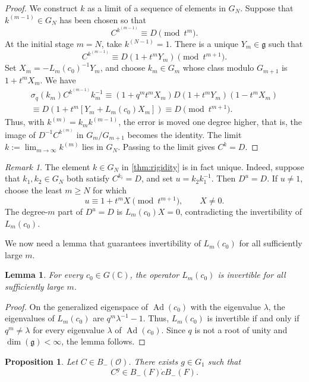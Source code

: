 \documentclass[11pt]{amsart}
\numberwithin{equation}{section}
\newtheorem{proposition}[proposition]{Proposition}
\newtheorem{lemma}[lemma]{Lemma}
\theoremstyle{definition}
\theoremstyle{remark}
\newtheorem{remark}[remark]{Remark}
\begin{document}
\begin{proof}
We construct $k$ as a limit of a sequence of elements in $G_N$. Suppose that $k^{(m-1)}\in G_N$ has been
chosen so that
\[
  C^{k^{(m-1)}}\equiv D\pmod{t^m}.
\]
At the initial stage $m=N$, take $k^{(N-1)}=1$.  There is a unique
$Y_m\in\mathfrak{g}$ such that
\[
  C^{k^{(m-1)}}\equiv D(1+t^mY_m)\pmod{t^{m+1}}.
\]
Set $X_m=-L_m(c_0)^{-1}Y_m$, and choose $k_m\in G_m$ whose class modulo $G_{m+1}$ is $1+t^mX_m$. We have
\begin{align}
  \sigma_q(k_m)C^{k^{(m-1)}}k_m^{-1}
  \equiv \left(1+q^mt^mX_m\right)D\left(1+t^mY_m\right)\left(1-t^mX_m\right)\\
  \equiv D\left(1+t^m[Y_m+L_m(c_0)X_m]\right)
  \equiv D\pmod{t^{m+1}}.
\end{align}
Thus, with $k^{(m)}=k_mk^{(m-1)}$, the error is moved one degree higher, that is, the image of $D^{-1}C^{k^{(m)}}$ in $G_m/G_{m+1}$ becomes the identity.
The limit $k:=\lim_{m\to\infty}k^{(m)}$ lies in $G_N$. Passing to the limit gives $C^k=D$.
\end{proof}
\begin{remark}
The element $k\in G_N$ in \cref{thm:rigidity} is in fact unique. Indeed, suppose that $k_1,k_2\in G_N$ both satisfy $C^{k_i}=D$, and set
$u=k_2k_1^{-1}$.  Then $D^u=D$.  If $u\neq1$, choose the least $m\geq N$
for which
\[
  u\equiv1+t^mX\pmod{t^{m+1}},\qquad X\neq0.
\]
The degree-$m$ part of $D^u=D$ is $L_m(c_0)X=0$, contradicting the
invertibility of $L_m(c_0)$.
\end{remark}
We now need a lemma that guarantees invertibility of $L_{m}(c_0)$ for all sufficiently large $m$.
\begin{lemma}\label{lem:finite-resonance}
For every $c_0\in G(\mathbb{C})$, the operator $L_m(c_0)$ is invertible for
all sufficiently large $m$.
\end{lemma}

\begin{proof}
On the generalized eigenspace of $\operatorname{Ad}(c_0)$ with the eigenvalue
$\lambda$, the eigenvalues of $L_m(c_0)$ are
$q^m\lambda^{-1}-1$.  Thus, $L_m(c_0)$ is invertible if and only if $q^m\neq\lambda$ for every eigenvalue $\lambda$ of $\operatorname{Ad}(c_0)$. Since $q$ is not a root of unity and $\dim(\mathfrak{g})< \infty$, the lemma follows.
\end{proof}
\begin{proposition}\label{prop:insertion}
Let $C\in B_-(\mathcal{O})$.  There exists $g\in G_1$ such that
\[
  C^g\in B_-(F)\dot cB_-(F).
\]
\end{proposition}
\end{document}
